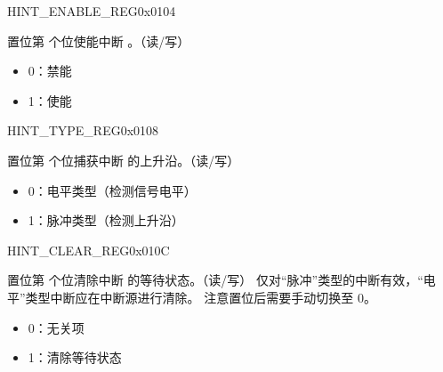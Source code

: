 
\begin{register}{H}{INT\_ENABLE\_REG}{0x0104}\label{regdesc:INTENABLEREG}
%
%
\regnewline%
\begin{regdesc}
\begin{reglist}
\item [INT\_ENABLE\lbrack\regindex{n}\rbrack] 置位第  个位使能中断 。（读/写）
\begin{itemize}
    \setlength\itemsep{-1em}
    \item 0：禁能
    \item 1：使能
\end{itemize}
\end{reglist}
\end{regdesc}
\end{register}

\begin{register}{H}{INT\_TYPE\_REG}{0x0108}\label{regdesc:INTTYPEREG}
%
%
\regnewline%
\begin{regdesc}
\begin{reglist}
\item [INT\_TYPE\lbrack\regindex{n}\rbrack] 置位第  个位捕获中断   的上升沿。（读/写）
\begin{itemize}
    \setlength\itemsep{-1em}
    \item 0：电平类型（检测信号电平）
    \item 1：脉冲类型（检测上升沿）
\end{itemize}
\end{reglist}
\end{regdesc}
\end{register}

\begin{register}{H}{INT\_CLEAR\_REG}{0x010C}\label{regdesc:INTCLEARREG}
%
%
\regnewline%
\begin{regdesc}
\begin{reglist}
\item [INT\_CLEAR\lbrack\regindex{n}\rbrack] 置位第  个位清除中断   的等待状态。（读/写） \newline 仅对“脉冲”类型的中断有效，“电平”类型中断应在中断源进行清除。 \newline 注意置位后需要手动切换至 0。
\begin{itemize}
    \setlength\itemsep{-1em}
    \item 0：无关项
    \item 1：清除等待状态
\end{itemize}
\end{reglist}
\end{regdesc}
\end{register}

